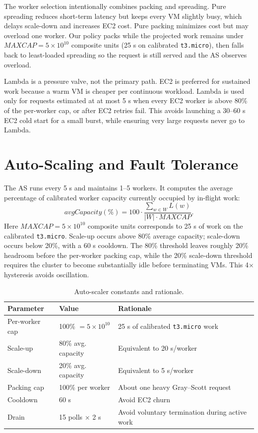 \documentclass[10pt]{article}
\begin{document}
The worker selection intentionally combines packing and spreading. Pure spreading reduces short-term latency but keeps every VM slightly busy, which delays scale-down and increases EC2 cost. Pure packing minimizes cost but may overload one worker. Our policy packs while the projected work remains under $MAXCAP=5\times10^{10}$ composite units (25 s on calibrated \texttt{t3.micro}), then falls back to least-loaded spreading so the request is still served and the AS observes overload.

Lambda is a pressure valve, not the primary path. EC2 is preferred for sustained work because a warm VM is cheaper per continuous workload. Lambda is used only for requests estimated at at most 5 s when every EC2 worker is above 80\% of the per-worker cap, or after EC2 retries fail. This avoids launching a 30--60 s EC2 cold start for a small burst, while ensuring very large requests never go to Lambda.

\section{Auto-Scaling and Fault Tolerance}

The AS runs every 5 s and maintains 1--5 workers. It computes the average percentage of calibrated worker capacity currently occupied by in-flight work:
\[
avgCapacity(\%)=100\cdot\frac{\sum_{w\in W}L(w)}{|W|\cdot MAXCAP}.
\]
Here $MAXCAP=5\times10^{10}$ composite units corresponds to 25 s of work on the calibrated \texttt{t3.micro}. Scale-up occurs above 80\% average capacity; scale-down occurs below 20\%, with a 60 s cooldown. The 80\% threshold leaves roughly 20\% headroom before the per-worker packing cap, while the 20\% scale-down threshold requires the cluster to become substantially idle before terminating VMs. This 4$\times$ hysteresis avoids oscillation.

\begin{table}[H]
\centering
\scriptsize
\caption{Auto-scaler constants and rationale.}
\begin{tabularx}{\columnwidth}{@{}lYY@{}}
\toprule
Parameter & Value & Rationale \\
\midrule
Per-worker cap & 100\% $=5\times10^{10}$ & 25 s of calibrated \texttt{t3.micro} work \\
Scale-up & 80\% avg. capacity & Equivalent to 20 s/worker \\
Scale-down & 20\% avg. capacity & Equivalent to 5 s/worker \\
Packing cap & 100\% per worker & About one heavy Gray--Scott request \\
Cooldown & 60 s & Avoid EC2 churn \\
Drain & 15 polls $\times$ 2 s & Avoid voluntary termination during active work \\
\bottomrule
\end{tabularx}
\end{table}
\end{document}
